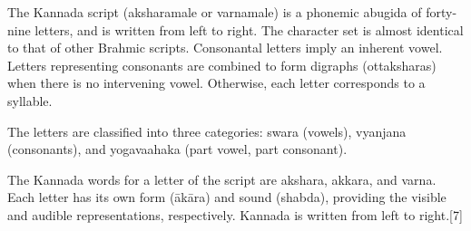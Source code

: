 \medskip

The Kannada script (aksharamale or varnamale) is a phonemic abugida of forty-nine letters, and is written from left to right. The character set is almost identical to that of other Brahmic scripts. Consonantal letters imply an inherent vowel. Letters representing consonants are combined to form digraphs (ottaksharas) when there is no intervening vowel. Otherwise, each letter corresponds to a syllable.

The letters are classified into three categories: swara (vowels), vyanjana (consonants), and yogavaahaka (part vowel, part consonant). 

The Kannada words for a letter of the script are akshara, akkara, and varna. Each letter has its own form (ākāra) and sound (shabda), providing the visible and audible representations, respectively. Kannada is written from left to right.[7]


